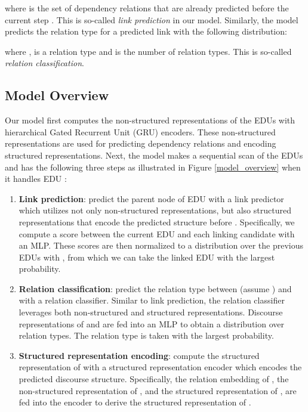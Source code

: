 \documentclass[letterpaper]{article} \usepackage{aaai19}  \usepackage{times}  \usepackage{helvet}  \usepackage{courier}  \usepackage{url}  \usepackage{graphicx}  \usepackage{amssymb}
\begin{document}
where  is the set of dependency relations that are already predicted before the current step .  This is so-called {\it link prediction} in our model.
Similarly, the model predicts the relation type for a predicted link  with the following distribution:

where ,  is a relation type and  is the number of relation types. This is so-called {\it relation classification}.

\subsection{Model Overview}

Our model first computes the non-structured representations of the EDUs with hierarchical Gated Recurrent Unit (GRU) \cite{cholearning} encoders.
These non-structured representations are used for predicting dependency relations and encoding structured representations.
Next, the model makes a sequential scan of the EDUs and has the following three steps as illustrated in Figure \ref{model_overview} when it handles EDU :
\begin{enumerate}
    \item \textbf{Link prediction}: predict the parent node  of EDU  with a link predictor which utilizes not only non-structured representations, but also structured representations that encode the predicted structure before . 
    Specifically, we compute a score between the current EDU  and each linking candidate  with an MLP. These scores are then normalized to a distribution over the previous EDUs  with , from which we can take the linked EDU with the largest probability.
    
    \item \textbf{Relation classification}: predict the relation type between  (assume ) and  with a relation classifier. Similar to link prediction, the relation classifier leverages both non-structured and structured representations. Discourse representations of  and  are fed into an MLP to obtain a distribution over relation types.
    The relation type  is taken with the largest probability.
    
    \item \textbf{Structured representation encoding}: compute the structured representation of  with a structured representation encoder which encodes the predicted discourse structure. Specifically, the relation embedding of , the non-structured representation of , and the structured representation of , are fed into the encoder to derive the structured representation of .    
    
\end{enumerate}
\end{document}
